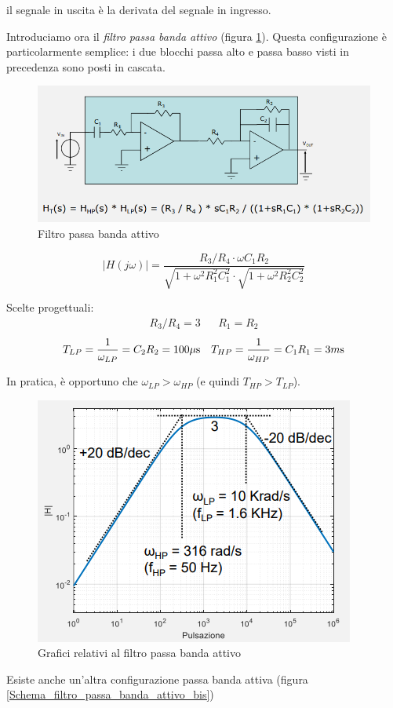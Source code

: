 \documentclass{article}
\begin{document}
il segnale in uscita è la derivata del segnale in ingresso.


\clearpage
Introduciamo ora il \textit{filtro passa banda attivo} (figura \ref{Schema_filtro_passa_banda_attivo}). Questa configurazione è particolarmente semplice: i due blocchi passa alto e passa basso visti in precedenza sono posti in cascata.

\begin{figure}[h]
  \centering
  \includegraphics[scale=0.7]{IM_filtro_passa_banda_attivo}
  \caption{Filtro passa banda attivo}
  \label{Schema_filtro_passa_banda_attivo}
\end{figure}

\[|H(j \omega)| = \frac{R_3 / R_4 \cdot \omega C_1 R_2}{\sqrt{1 + \omega ^2 R^2_1 C^2_1} \cdot \sqrt{1 + \omega ^2 R^2_2 C^2_2}}\]

Scelte progettuali:
\begin{align*}
  R_3 / R_4 = 3 && R_1 = R_2 
\end{align*}
\begin{align*}
  T_{LP} = \frac{1}{\omega _{LP}} = C_2 R_2 = 100 \mu \textrm s && T_{HP} = \frac{1}{\omega _{HP}} = C_1 R_1 = 3 m \textrm s
\end{align*}

In pratica, è opportuno che $\omega _{LP} > \omega _{HP}$ (e quindi $T_{HP} > T_{LP}$).

\begin{figure}[h]
  \centering
  \includegraphics[scale=0.7]{IM_filtro_passa_banda_attivo_grafici}
  \caption{Grafici relativi al filtro passa banda attivo}
  \label{Schema_filtro_passa_banda_attivo_grafici}
\end{figure}
\clearpage
Esiste anche un'altra configurazione passa banda attiva (figura \ref{Schema_filtro_passa_banda_attivo_bis})
\end{document}
